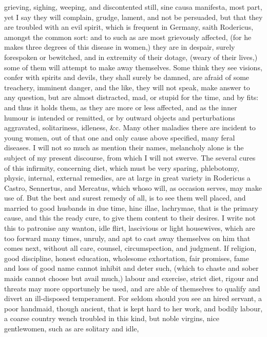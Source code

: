 {grieving, sighing, weeping, and discontented still, sine causa
manifesta, most part, yet I say they will complain, grudge, lament, and
not be persuaded, but that they are troubled with an evil spirit, which
is frequent in Germany, saith Rodericus, amongst the common sort: and
to such as are most grievously affected, (for he makes three degrees of
this disease in women,) they are in despair, surely forespoken or
bewitched, and in extremity of their dotage, (weary of their lives,)
some of them will attempt to make away themselves. Some think they see
visions, confer with spirits and devils, they shall surely be damned,
are afraid of some treachery, imminent danger, and the like, they will
not speak, make answer to any question, but are almost distracted, mad,
or stupid for the time, and by fits: and thus it holds them, as they
are more or less affected, and as the inner humour is intended or
remitted, or by outward objects and perturbations aggravated,
solitariness, idleness, \&c.
Many other maladies there are incident to young women, out of that one
and only cause above specified, many feral diseases. I will not so much
as mention their names, melancholy alone is the subject of my present
discourse, from which I will not swerve. The several cures of this
infirmity, concerning diet, which must be very sparing, phlebotomy,
physic, internal, external remedies, are at large in great variety in
 Rodericus a Castro, Sennertus, and Mercatus, which whoso will,
as occasion serves, may make use of. But the best and surest remedy of
all, is to see them well placed, and married to good husbands in due
time, hinc illae, lachrymae, that is the primary cause, and this the
ready cure, to give them content to their desires. I write not this to
patronise any wanton, idle flirt, lascivious or light housewives, which
are too forward many times, unruly, and apt to cast away themselves on
him that comes next, without all care, counsel, circumspection, and
judgment. If religion, good discipline, honest education, wholesome
exhortation, fair promises, fame and loss of good name cannot inhibit
and deter such, (which to chaste and sober maids cannot choose but
avail much,) labour and exercise, strict diet, rigour and threats may
more opportunely be used, and are able of themselves to qualify and
divert an ill-disposed temperament. For seldom should you see an hired
servant, a poor handmaid, though ancient, that is kept hard to her
work, and bodily labour, a coarse country wench troubled in this kind,
but noble virgins, nice gentlewomen, such as are solitary and idle,
}
